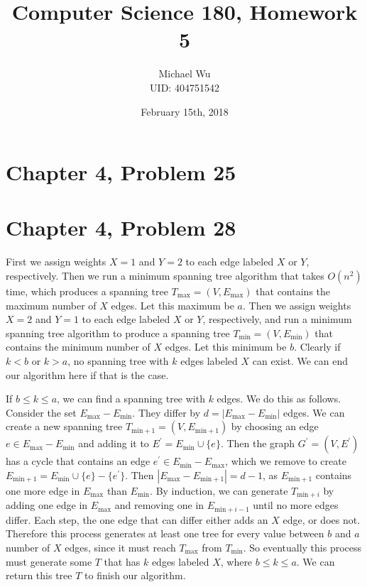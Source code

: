 \documentclass[12pt]{article}
\begin{document}
\title{Computer Science 180, Homework 5}
\date{February 15th, 2018}
\author{Michael Wu\\UID: 404751542}
\maketitle

\section*{Chapter 4, Problem 25}

\pagebreak

\section*{Chapter 4, Problem 28}

First we assign weights \(X=1\) and \(Y=2\) to each edge labeled \(X\) or \(Y\), respectively. Then we run a minimum spanning tree
algorithm that takes \(O(n^2)\) time, which produces a spanning tree \(T_\text{max}=(V,E_\text{max})\) that contains the maximum
number of \(X\) edges. Let this maximum be \(a\). Then we assign weights \(X=2\) and \(Y=1\) to each edge labeled \(X\) or \(Y\),
respectively, and run a minimum spanning tree algorithm to produce a spanning tree \(T_\text{min}=(V,E_\text{min})\) that contains
the minimum number of \(X\) edges. Let this minimum be \(b\). Clearly if \(k<b\) or \(k>a\), no spanning tree with \(k\) edges labeled
\(X\) can exist. We can end our algorithm here if that is the case.

If \(b\leq k \leq a\), we can find a spanning tree with \(k\) edges. We do this as follows. Consider the set
\(E_\text{max}-E_\text{min}\). They differ by \(d=|E_\text{max}-E_\text{min}|\) edges. We can create a new spanning tree \(T_{\text{min}+1}=(V,E_{\text{min}+1})\)
by choosing an edge \(e\in E_\text{max}-E_\text{min}\) and adding it to \(E^\prime = E_\text{min}\cup \{e\}\). Then the graph \(G^\prime=(V,E^\prime)\)
has a cycle that contains an edge \(e^\prime\in E_\text{min}-E_\text{max}\), which we remove to create \(E_{\text{min}+1} = E_\text{min}\cup \{e\}-\{e^\prime\}\).
Then \(|E_\text{max}-E_{\text{min}+1}|=d-1\), as \(E_{\text{min}+1}\) contains one more edge in \(E_\text{max}\) than \(E_\text{min}\). By induction,
we can generate \(T_{\text{min}+i}\) by adding one edge in \(E_\text{max}\) and removing one in \(E_{\text{min}+i-1}\) until no more edges differ.
Each step, the one edge that can differ either adds an \(X\) edge, or does not. Therefore this process generates at least one tree for every value between
\(b\) and \(a\) number of \(X\) edges, since it must reach \(T_\text{max}\) from \(T_\text{min}\). So eventually this process must generate some \(T\) that
has \(k\) edges labeled \(X\), where \(b\leq k\leq a\). We can return this tree \(T\) to finish our algorithm.
\end{document}
